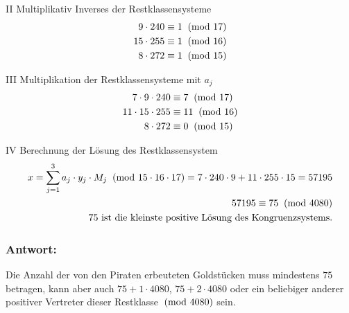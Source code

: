 II Multiplikativ Inverses der Restklassensysteme
\begin{align*}
 9 \cdot 240 &\equiv 1 \imod{17}\\
15 \cdot 255 &\equiv 1 \imod{16}\\
8 \cdot 272 &\equiv 1 \imod{15}
\end{align*}

III  Multiplikation der Restklassensysteme mit $a_j$
\begin{align*}
7 \cdot 9 \cdot 240     &\equiv 7   \imod{17}\\
11 \cdot 15 \cdot 255   &\equiv 11  \imod{16}\\
8 \cdot 272             &\equiv 0   \imod{15}
\end{align*}

IV Berechnung der Lösung des Restklassensystem
\begin{align*}
x = \sum_{j = 1}^3 a_j \cdot y_j \cdot M_j \imod{15 \cdot 16 \cdot 17} = 7 \cdot 240 \cdot 9 + 11 \cdot 255 \cdot 15 = 57195\\
57195 \equiv 75 \imod{4080}\\
75 \text{ ist die kleinste positive Lösung des Kongruenzsystems.}
\end{align*}

\subsubsection*{Antwort:}
Die Anzahl der von den Piraten erbeuteten Goldstücken muss mindestens $75$ betragen, kann aber auch $75 + 1 \cdot 4080$, $75 + 2 \cdot 4080$  oder ein beliebiger anderer positiver Vertreter dieser Restklasse$\imod{4080}$ sein.

